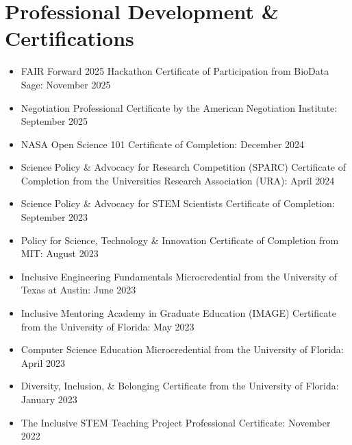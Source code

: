 \documentclass[letterpaper,11pt]{article}
\begin{document}
\nocite{*}
\printbibliography[heading=none,keyword=other,prenote=symbols]
\fi


\ifcv
\section*{Professional Development \& Certifications}

\begin{itemize}
    \item FAIR Forward 2025 Hackathon Certificate of Participation from BioData Sage: November 2025
    \item Negotiation Professional Certificate by the American Negotiation Institute: September 2025
    \item NASA Open Science 101 Certificate of Completion: December 2024
    \item Science Policy \& Advocacy for Research Competition (SPARC) Certificate of Completion from the Universities Research Association (URA): April 2024
    \item Science Policy \& Advocacy for STEM Scientists Certificate of Completion: September 2023
    \item Policy for Science, Technology \& Innovation Certificate of Completion from MIT: August 2023
    \item Inclusive Engineering Fundamentals Microcredential from the University of Texas at Austin: June 2023
    \item Inclusive Mentoring Academy in Graduate Education (IMAGE) Certificate from the University of Florida: May 2023
    \item Computer Science Education Microcredential from the University of Florida: April 2023
    \item Diversity, Inclusion, \& Belonging Certificate from the University of Florida: January 2023
    \item The Inclusive STEM Teaching Project Professional Certificate: November 2022
\end{itemize}

\fi

\end{document}
